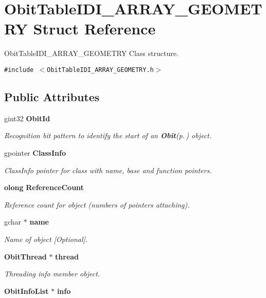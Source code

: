 \section{Obit\-Table\-IDI\_\-ARRAY\_\-GEOMETRY Struct Reference}
\label{structObitTableIDI__ARRAY__GEOMETRY}
Obit\-Table\-IDI\_\-ARRAY\_\-GEOMETRY Class structure.  


{\tt \#include $<$Obit\-Table\-IDI\_\-ARRAY\_\-GEOMETRY.h$>$}

\subsection*{Public Attributes}
\begin{CompactItemize}
\item 
gint32 {\bf Obit\-Id}
\begin{CompactList}\small\item\em Recognition bit pattern to identify the start of an {\bf Obit}{\rm (p.\,\pageref{structObit})} object. \item\end{CompactList}\item 
gpointer {\bf Class\-Info}
\begin{CompactList}\small\item\em Class\-Info pointer for class with name, base and function pointers. \item\end{CompactList}\item 
{\bf olong} {\bf Reference\-Count}
\begin{CompactList}\small\item\em Reference count for object (numbers of pointers attaching). \item\end{CompactList}\item 
gchar $\ast$ {\bf name}
\begin{CompactList}\small\item\em Name of object [Optional]. \item\end{CompactList}\item 
{\bf Obit\-Thread} $\ast$ {\bf thread}
\begin{CompactList}\small\item\em Threading info member object. \item\end{CompactList}\item 
{\bf Obit\-Info\-List} $\ast$ {\bf info}

\end{CompactItemize}
